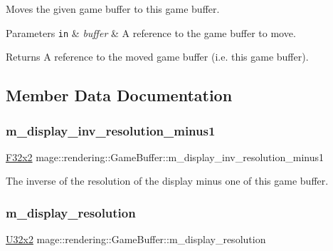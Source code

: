 Moves the given game buffer to this game buffer.


\begin{DoxyParams}[1]{Parameters}
\mbox{\tt in}  & {\em buffer} & A reference to the game buffer to move. \\
\hline
\end{DoxyParams}
\begin{DoxyReturn}{Returns}
A reference to the moved game buffer (i.\+e. this game buffer). 
\end{DoxyReturn}


\subsection{Member Data Documentation}
\hypertarget{structmage_1_1rendering_1_1_game_buffer_a046916a46d80f979ac4f16c2ba58d8ef}{}\label{structmage_1_1rendering_1_1_game_buffer_a046916a46d80f979ac4f16c2ba58d8ef} 
\subsubsection{\texorpdfstring{m\+\_\+display\+\_\+inv\+\_\+resolution\+\_\+minus1}{m\_display\_inv\_resolution\_minus1}}
{\footnotesize\ttfamily \hyperlink{namespacemage_aa87237ad091f5cd7da612b8523fc108f}{F32x2} mage\+::rendering\+::\+Game\+Buffer\+::m\+\_\+display\+\_\+inv\+\_\+resolution\+\_\+minus1}

The inverse of the resolution of the display minus one of this game buffer. \hypertarget{structmage_1_1rendering_1_1_game_buffer_a0d1ae294ea443c48c348af75442a8f54}{}\label{structmage_1_1rendering_1_1_game_buffer_a0d1ae294ea443c48c348af75442a8f54} 
\subsubsection{\texorpdfstring{m\+\_\+display\+\_\+resolution}{m\_display\_resolution}}
{\footnotesize\ttfamily \hyperlink{namespacemage_a88e05bff0300120c013285d3dcad95c5}{U32x2} mage\+::rendering\+::\+Game\+Buffer\+::m\+\_\+display\+\_\+resolution}

